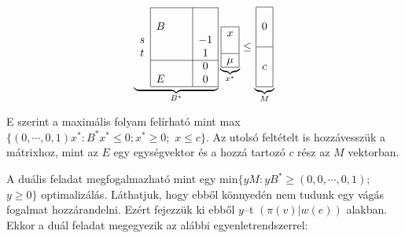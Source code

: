 \vspace{0.4cm}
\begin{wrapfigure}{L}{0.35\textwidth}
	\begin{center}
		\vspace{-1.3cm}
		\begin{displaymath}
			\underbrace{
				\begin{array}{c|ccc|c|}
					\cline{2-5}
					  &   &  &  &    \\
					  & B &  &  &    \\
					s &   &  &  & -1 \\
					t &   &  &  & 1  \\
					\cline{2-5}
					  &   &  &  & 0  \\
					  & E &  &  & 0  \\
					\cline{2-5}
				\end{array}}_{B^*}
			\underbrace{
				\begin{array}{|c|}
					\hline
					x   \\
					\\
					\hline
					\mu \\
					\hline
				\end{array}}_{x^*}
			\leq
			\underbrace{
				\begin{array}{|c|}
					\hline
					\\
					0 \\
					\\
					\hline
					\\
					c \\
					\\
					\hline
				\end{array}}_{M}
		\end{displaymath}
		\vspace{-1.3cm}
	\end{center}
\end{wrapfigure}
E szerint a maximális folyam felírható mint max$\{ (0, \cdots,0,1)x^* : B^*x^* \leq
	0; x^* \geq 0;$ $x \leq c \}$. Az utolsó feltételt is hozzávesszük a mátrixhoz,
mint az $E$ egy egységvektor és a hozzá tartozó $c$ rész az $M$ vektorban.

A duális feladat megfogalmazható mint egy min$\{ yM :yB^* \geq (0, 0, \cdots, 0,
	1);$ $y \geq 0 \}$ optimalizálás. Láthatjuk, hogy ebből könnyedén nem tudunk egy
vágás fogalmat hozzárandelni. Ezért fejezzük ki ebből $y$--t $\left(
	\pi\left(v\right) | w\left(e\right)\right)$ alakban. Ekkor a duál feladat
megegyezik az alábbi egyenletrendszerrel:

